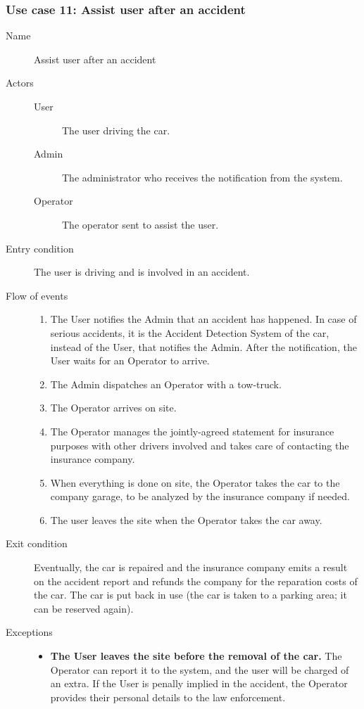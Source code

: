 	\subsubsection{Use case 11: Assist user after an accident}
		\begin{description}
			\item[Name] Assist user after an accident
			\item[Actors] \hfill
			\begin{description}
				\item[User] The user driving the car.
				\item[Admin] The administrator who receives the notification from the system.
				\item[Operator] The operator sent to assist the user.
			\end{description}
			\item[Entry condition] The user is driving and is involved in an accident.
			\item[Flow of events] \hfill
			\begin{enumerate}
				\item The User notifies the Admin that an accident has happened. In case of serious accidents, it is the Accident Detection System of the car, instead of the User, that notifies the Admin. After the notification, the User waits for an Operator to arrive.
				\item The Admin dispatches an Operator with a tow-truck.
				\item The Operator arrives on site.
				\item The Operator manages the jointly-agreed statement for insurance purposes with other drivers involved and takes care of contacting the insurance company.
				\item When everything is done on site, the Operator takes the car to the company garage, to be analyzed by the insurance company if needed.
				\item The user leaves the site when the Operator takes the car away.
			\end{enumerate}
			\item[Exit condition] Eventually, the car is repaired and the insurance company emits a result on the accident report and refunds the company for the reparation costs of the car. The car is put back in use (the car is taken to a parking area; it can be reserved again).
			\item[Exceptions] \hfill
			\begin{itemize}
				\item \textbf{The User leaves the site before the removal of the car.} The Operator can report it to the system, and the user will be charged of an extra. If the User is penally implied in the accident, the Operator provides their personal details to the law enforcement.

\end{itemize}
\end{description}
